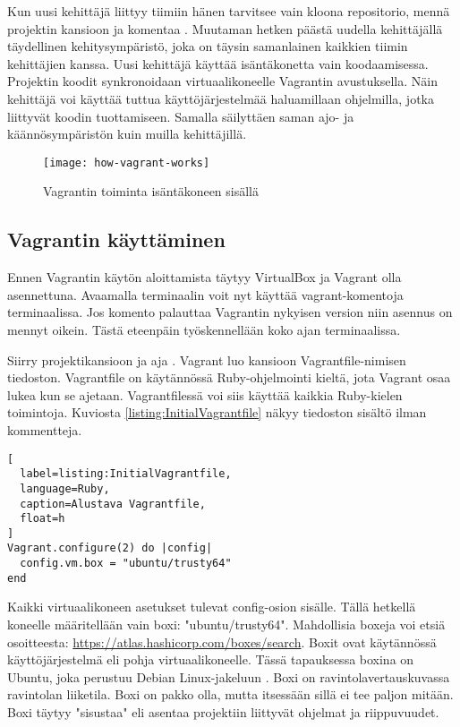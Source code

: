 Kun uusi kehittäjä liittyy tiimiin hänen tarvitsee vain kloona repositorio, mennä projektin kansioon ja komentaa . Muutaman hetken päästä uudella kehittäjällä täydellinen kehitysympäristö, joka on täysin samanlainen kaikkien tiimin kehittäjien kanssa. Uusi kehittäjä käyttää isäntäkonetta vain koodaamisessa. Projektin koodit synkronoidaan virtuaalikoneelle Vagrantin avustuksella. Näin kehittäjä voi käyttää tuttua käyttöjärjestelmää haluamillaan ohjelmilla, jotka liittyvät koodin tuottamiseen. Samalla säilyttäen saman ajo- ja käännösympäristön kuin muilla kehittäjillä.

\begin{figure}[h]
  \texttt{[image: how-vagrant-works]}
  \caption{Vagrantin toiminta isäntäkoneen sisällä}
  \label{fig:how-vagrant-works}
\end{figure}

\subsection{Vagrantin käyttäminen}
Ennen Vagrantin käytön aloittamista täytyy VirtualBox ja Vagrant olla asennettuna. Avaamalla terminaalin voit nyt käyttää vagrant-komentoja terminaalissa. Jos komento  palauttaa Vagrantin nykyisen version niin asennus on mennyt oikein. Tästä eteenpäin työskennellään koko ajan terminaalissa.

Siirry projektikansioon ja aja . Vagrant luo kansioon Vagrantfile-nimisen tiedoston. Vagrantfile on käytännössä Ruby-ohjelmointi kieltä, jota Vagrant osaa lukea kun se ajetaan. Vagrantfilessä voi siis käyttää kaikkia Ruby-kielen toimintoja. Kuviosta \ref{listing:InitialVagrantfile} näkyy tiedoston sisältö ilman kommentteja.

\begin{lstlisting}[
  label=listing:InitialVagrantfile,
  language=Ruby,
  caption=Alustava Vagrantfile,
  float=h
]
Vagrant.configure(2) do |config|
  config.vm.box = "ubuntu/trusty64"
end
\end{lstlisting}

Kaikki virtuaalikoneen asetukset tulevat config-osion sisälle. Tällä hetkellä koneelle määritellään vain boxi: "ubuntu/trusty64". Mahdollisia boxeja voi etsiä osoitteesta: \url{https://atlas.hashicorp.com/boxes/search}. Boxit ovat käytännössä käyttöjärjestelmä eli pohja virtuaalikoneelle. Tässä tapauksessa boxina on Ubuntu, joka perustuu Debian Linux-jakeluun \cite{link:ubuntu}. Boxi on ravintolavertauskuvassa ravintolan liiketila. Boxi on pakko olla, mutta itsessään sillä ei tee paljon mitään. Boxi täytyy "sisustaa" eli asentaa projektiin liittyvät ohjelmat ja riippuvuudet.

